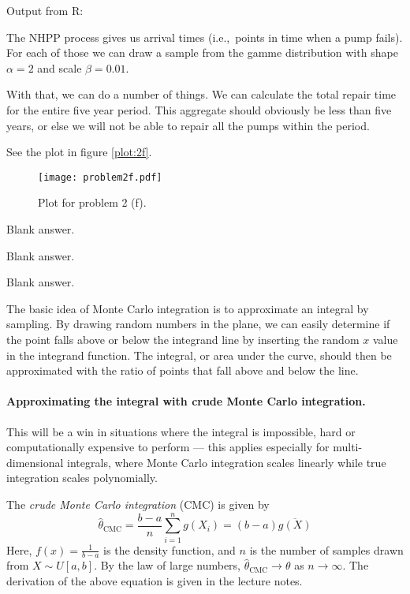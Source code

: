 \documentclass[a4paper,english,12pt]{article}
\begin{document}
Output from R:

The NHPP process gives us arrival times (i.e.,~points in time when a pump
fails). For each of those we can draw a sample from the gamme distribution with
shape $\alpha = 2$ and scale $\beta = 0.01$.

With that, we can do a number of things. We can calculate the total repair time
for the entire five year period. This aggregate should obviously be less than
five years, or else we will not be able to repair all the pumps within the
period.

See the plot in figure \vref{plot:2f}.

\begin{figure}
  \centering
  \texttt{[image: problem2f.pdf]}
  \caption{Plot for problem 2 (f).}
  \label{plot:2f}
\end{figure}

Blank answer.

Blank answer.

Blank answer.

\clearpage
{}
The basic idea of Monte Carlo integration is to approximate an integral by
sampling. By drawing random numbers in the plane, we can easily determine if
the point falls above or below the integrand line by inserting the random $x$
value in the integrand function. The integral, or area under the curve, should
then be approximated with the ratio of points that fall above and below the
line.

\paragraph{Approximating the integral with crude Monte Carlo integration.}

This will be a win in situations where the integral is impossible, hard or
computationally expensive to perform --- this applies especially for
multi-dimensional integrals, where Monte Carlo integration scales linearly
while true integration scales polynomially.

The \textit{crude Monte Carlo integration} (CMC) is given by
\[
  \hat{\theta}_{\textrm{CMC}} = \frac{b-a}{n} \sum_{i=1}^{n} g(X_i) =
  (b-a)\overline{g(X)}
\]
Here, $f(x) = \frac{1}{b-a}$ is the density function, and $n$ is the number of
samples drawn from $X \sim U[a,b]$. By the law of large numbers,
$\hat{\theta}_{\textrm{CMC}} \to \theta$ as $n \to \infty$. The derivation of the above
equation is given in the lecture notes.
\end{document}
